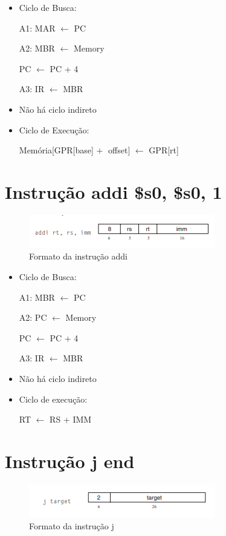 \documentclass[
	12pt,				%
	oneside,			%
	a4paper,			%
	english,			%
	brazil				%
	]{abntex2ppgsi}
\begin{document}
\begin{itemize}
    \item Ciclo de Busca:

    A1: MAR $\leftarrow$ PC

    A2: MBR $\leftarrow$ Memory

    PC  $\leftarrow$ PC + 4

    A3: IR  $\leftarrow$ MBR

    \item Não há ciclo indireto
    \item Ciclo de Execução:

     Memória[GPR[base] $+$ offset] $\leftarrow$ GPR[rt]
     
\end{itemize}

\section{Instrução addi \$s0, \$s0, 1}

\begin{figure}[h]
    \centering
    \includegraphics{4_10.png}
    \caption{Formato da instrução addi}
    \label{fig4_10}
\end{figure}

\begin{itemize}
    \item Ciclo de Busca:

    A1: MBR $\leftarrow$ PC

    A2: PC $\leftarrow$ Memory

    PC $\leftarrow$ PC + 4

    A3: IR $\leftarrow$ MBR

    \item Não há ciclo indireto

    \item Ciclo de execução:
    
    RT $\leftarrow$ RS + IMM
\end{itemize}

\section{Instrução j end}

\begin{figure}[h]
    \centering
    \includegraphics{4_11.png}
    \caption{Formato da instrução j}
    \label{fig4_11}
\end{figure}
\end{document}
